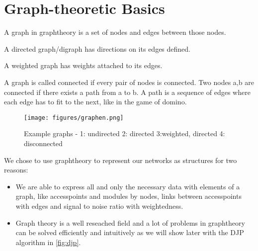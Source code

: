 	
\section{Graph-theoretic Basics}
  A graph in graphtheory is a set of nodes and edges between those nodes. 
  
  A directed graph/digraph has directions on its edges defined.
  
  A weighted graph has weights attached to its edges.
  
  A graph is called connected if every pair of nodes is connected. 
  Two nodes a,b are connected if there exists a path from a to b.
  A path is a sequence of edges where each edge has to fit to the next, like in the game of domino.
  
  \begin{figure}[th!]
    \centering
    \texttt{[image: figures/graphen.png]}
    \caption{Example graphs - 1: undirected 2: directed 3:weighted, directed 4: disconnected}
    \label{fig:graphen}
  \end{figure}

  We chose to use graphtheory to represent our networks as structures for two reasons:
  \begin{itemize}
   \item We are able to express all and only the necessary data with elements of a graph, like
    accesspoints and modules by nodes, links between accesspoints with edges and signal to noise ratio with weightedness. 
   \item Graph theory is a well reseached field and a lot of problems in graphtheory can be solved efficiently and intuitively 
    as we will show later with the \ac{DJP} algorithm in \ref{fig:djp}.
  \end{itemize}
    

